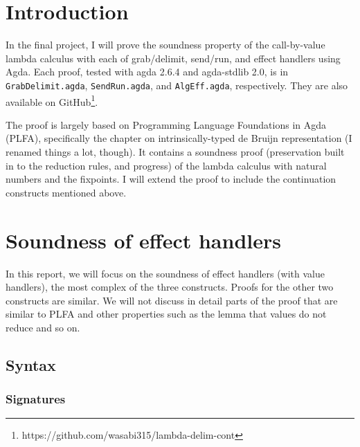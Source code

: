 \documentclass[a4paper,11pt]{article}
\begin{document}
\section{Introduction}

In the final project, I will prove the soundness property of the call-by-value lambda calculus with each of grab/delimit, send/run, and effect handlers using Agda.
Each proof, tested with agda 2.6.4 and agda-stdlib 2.0, is in \texttt{GrabDelimit.agda}, \texttt{SendRun.agda}, and \texttt{AlgEff.agda}, respectively.
They are also available on GitHub\footnote[1]{https://github.com/wasabi315/lambda-delim-cont}.

The proof is largely based on Programming Language Foundations in Agda (PLFA)\cite{plfa22.08}, specifically the chapter on intrinsically-typed de Bruijn representation (I renamed things a lot, though). It contains a soundness proof (preservation built in to the reduction rules, and progress) of the lambda calculus with natural numbers and the fixpoints. I will extend the proof to include the continuation constructs mentioned above.

\section{Soundness of effect handlers}

In this report, we will focus on the soundness of effect handlers (with value handlers), the most complex of the three constructs. Proofs for the other two constructs are similar. We will not discuss in detail parts of the proof that are similar to PLFA and other properties such as the lemma that values do not reduce and so on.

\subsection{Syntax}

\subsubsection{Signatures}
\end{document}

